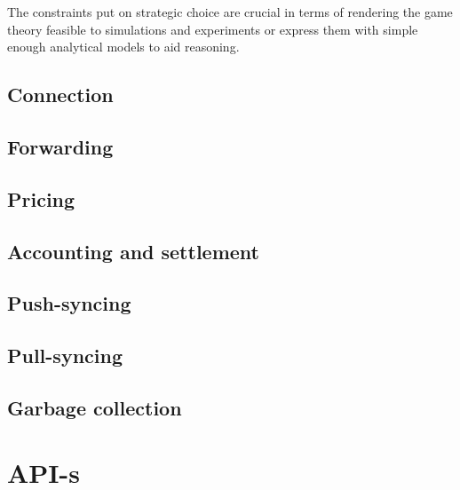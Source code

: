 The constraints put on strategic choice are crucial in terms of rendering the game theory feasible to simulations and experiments or express them with simple enough analytical models to aid reasoning. 

\section{Connection  \statusorange}\label{spec:strategy:connection}


\section{Forwarding  \statusorange}\label{spec:strategy:forwarding}


\section{Pricing  \statusorange}\label{spec:strategy:pricing}


\section{Accounting and settlement  \statusorange}\label{spec:strategy:swap}


\section{Push-syncing  \statusorange}\label{spec:strategy:push-sync}


\section{Pull-syncing  \statusorange}\label{spec:strategy:pull-sync}


\section{Garbage collection \statusorange}\label{spec:strategy:garbage-collection}


\chapter{API-s}\label{spec:api}


